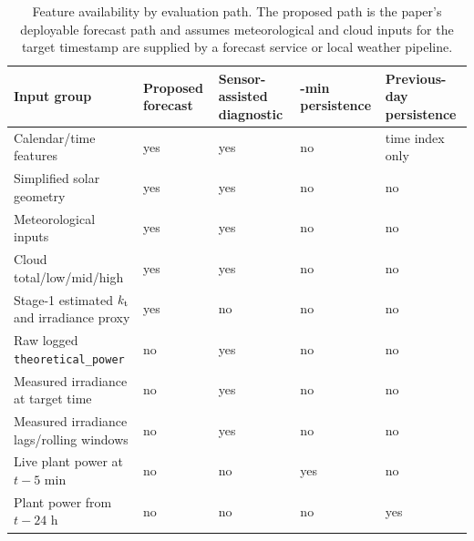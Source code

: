 \begin{table}[!t]
\caption{Feature availability by evaluation path. The proposed path is the paper's deployable forecast path and assumes meteorological and cloud inputs for the target timestamp are supplied by a forecast service or local weather pipeline.}
\label{tab:feature_availability}
\centering
\scriptsize
\setlength{\tabcolsep}{3pt}
\begin{tabularx}{\textwidth}{@{}>{\raggedright\arraybackslash}p{}*{4}{>{\centering\arraybackslash}X}@{}}
\toprule
Input group & Proposed forecast & Sensor-assisted diagnostic & 5-min persistence & Previous-day persistence \\
\midrule
Calendar/time features & yes & yes & no & time index only \\
Simplified solar geometry & yes & yes & no & no \\
Meteorological inputs & yes & yes & no & no \\
Cloud total/low/mid/high & yes & yes & no & no \\
Stage-1 estimated $k_{\mathrm{t}}$ and irradiance proxy & yes & no & no & no \\
Raw logged \texttt{theoretical\_power} & no & yes & no & no \\
Measured irradiance at target time & no & yes & no & no \\
Measured irradiance lags/rolling windows & no & yes & no & no \\
Live plant power at $t-5$ min & no & no & yes & no \\
Plant power from $t-24$ h & no & no & no & yes \\
\bottomrule
\end{tabularx}
\end{table}
